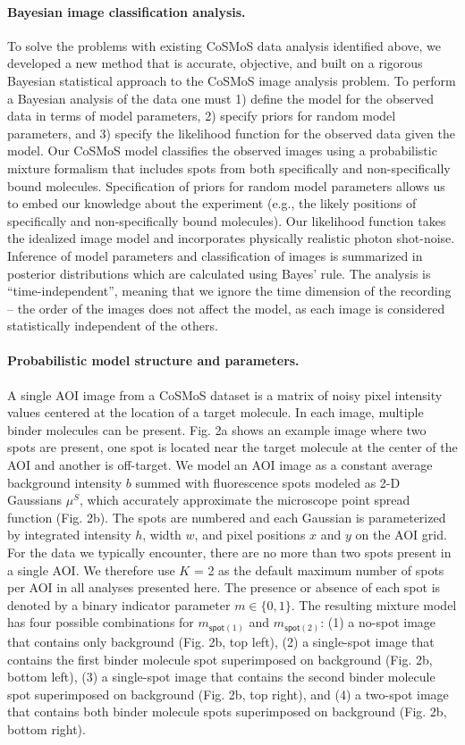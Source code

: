 \paragraph{Bayesian image classification analysis.}
To solve the problems with existing CoSMoS data analysis identified above, we developed a new method that is accurate, objective, and built on a rigorous Bayesian statistical approach to the CoSMoS image analysis problem. To perform a Bayesian analysis of the data one must 1) define the model for the observed data in terms of model parameters, 2) specify priors for random model parameters, and 3) specify the likelihood function for the observed data given the model. Our CoSMoS model classifies the observed images using a probabilistic mixture formalism that includes spots from both specifically and non-specifically bound molecules. Specification of priors for random model parameters allows us to embed our knowledge about the experiment (e.g., the likely positions of specifically and non-specifically bound molecules). Our likelihood function takes the idealized image model and incorporates physically realistic photon shot-noise. Inference of model parameters and classification of images is summarized in posterior distributions which are calculated using Bayes' rule. The analysis is “time-independent”, meaning that we ignore the time dimension of the recording -- the order of the images does not affect the model, as each image is considered statistically independent of the others. 

\paragraph{Probabilistic model structure and parameters.} %
A single AOI image from a CoSMoS dataset is a matrix of noisy pixel intensity values centered at the location of a target molecule. In each image, multiple binder molecules can be present. Fig. 2a shows an example image where two spots are present, one spot is located near the target molecule at the center of the AOI and another is off-target. We model an AOI image as a constant average background intensity $b$ summed with fluorescence spots modeled as 2-D Gaussians $\mu^S$, which accurately approximate the microscope point spread function \cite{Zhang2007-rb} (Fig. 2b). The spots are numbered and each Gaussian is parameterized by integrated intensity $h$, width $w$, and pixel positions $x$ and $y$ on the AOI grid. For the data we typically encounter, there are no more than two spots present in a single AOI. We therefore use $K$ = 2 as the default maximum  number of spots per AOI in all analyses presented here. The presence or absence of each spot is denoted by a binary indicator parameter $m \in \{0, 1\}$. The resulting mixture model has four possible combinations for $m_{\mathsf{spot}(1)}$ and $m_{\mathsf{spot}(2)}$: (1) a no-spot image that contains only background (Fig. 2b, top left), (2) a single-spot image that contains the first binder molecule spot superimposed on background (Fig. 2b, bottom left), (3) a single-spot image that contains the second binder molecule spot superimposed on background (Fig. 2b, top right), and (4) a two-spot image that contains both binder molecule spots superimposed on background (Fig. 2b, bottom right).

